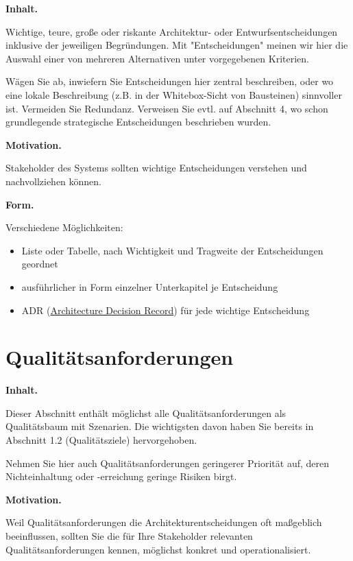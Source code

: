 \documentclass[]{article}
\begin{document}
\textbf{Inhalt.}

Wichtige, teure, große oder riskante Architektur- oder
Entwurfsentscheidungen inklusive der jeweiligen Begründungen. Mit
"Entscheidungen" meinen wir hier die Auswahl einer von mehreren
Alternativen unter vorgegebenen Kriterien.

Wägen Sie ab, inwiefern Sie Entscheidungen hier zentral beschreiben,
oder wo eine lokale Beschreibung (z.B. in der Whitebox-Sicht von
Bausteinen) sinnvoller ist. Vermeiden Sie Redundanz. Verweisen Sie evtl.
auf Abschnitt 4, wo schon grundlegende strategische Entscheidungen
beschrieben wurden.

\textbf{Motivation.}

Stakeholder des Systems sollten wichtige Entscheidungen verstehen und
nachvollziehen können.

\textbf{Form.}

Verschiedene Möglichkeiten:

\begin{itemize}
\item
  Liste oder Tabelle, nach Wichtigkeit und Tragweite der Entscheidungen
  geordnet
\item
  ausführlicher in Form einzelner Unterkapitel je Entscheidung
\item
  ADR
  (\href{http://thinkrelevance.com/blog/2011/11/15/documenting-architecture-decisions}{Architecture
  Decision Record}) für jede wichtige Entscheidung
\end{itemize}

\hypertarget{section-quality-scenarios}{%
\section{Qualitätsanforderungen}\label{section-quality-scenarios}}

\textbf{Inhalt.}

Dieser Abschnitt enthält möglichst alle Qualitätsanforderungen als
Qualitätsbaum mit Szenarien. Die wichtigsten davon haben Sie bereits in
Abschnitt 1.2 (Qualitätsziele) hervorgehoben.

Nehmen Sie hier auch Qualitätsanforderungen geringerer Priorität auf,
deren Nichteinhaltung oder -erreichung geringe Risiken birgt.

\textbf{Motivation.}

Weil Qualitätsanforderungen die Architekturentscheidungen oft maßgeblich
beeinflussen, sollten Sie die für Ihre Stakeholder relevanten
Qualitätsanforderungen kennen, möglichst konkret und operationalisiert.
\end{document}
